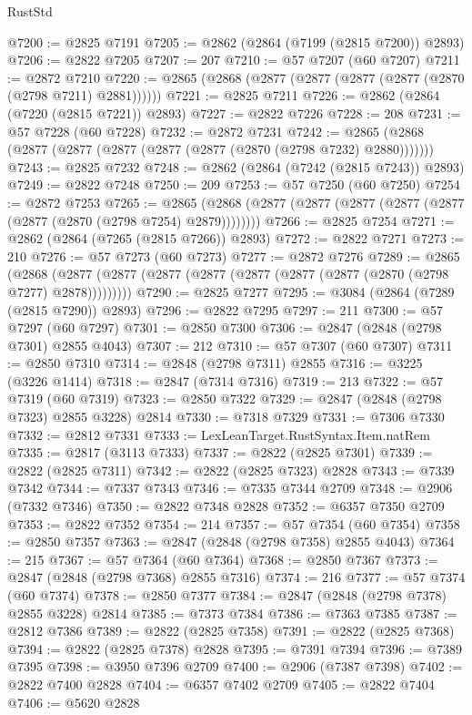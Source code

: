 \begin{lexlean}{RustStd}
\begin{coremodule}
@7200 := @2825 @7191
@7205 := @2862 (@2864 (@7199 (@2815 @7200)) @2893)
@7206 := @2822 @7205
@7207 := 207
@7210 := @57 @7207 (@60 @7207)
@7211 := @2872 @7210
@7220 := @2865 (@2868 (@2877 (@2877 (@2877 (@2877 (@2870 (@2798 @7211) @2881))))))
@7221 := @2825 @7211
@7226 := @2862 (@2864 (@7220 (@2815 @7221)) @2893)
@7227 := @2822 @7226
@7228 := 208
@7231 := @57 @7228 (@60 @7228)
@7232 := @2872 @7231
@7242 := @2865 (@2868 (@2877 (@2877 (@2877 (@2877 (@2877 (@2870 (@2798 @7232) @2880)))))))
@7243 := @2825 @7232
@7248 := @2862 (@2864 (@7242 (@2815 @7243)) @2893)
@7249 := @2822 @7248
@7250 := 209
@7253 := @57 @7250 (@60 @7250)
@7254 := @2872 @7253
@7265 := @2865 (@2868 (@2877 (@2877 (@2877 (@2877 (@2877 (@2877 (@2870 (@2798 @7254) @2879))))))))
@7266 := @2825 @7254
@7271 := @2862 (@2864 (@7265 (@2815 @7266)) @2893)
@7272 := @2822 @7271
@7273 := 210
@7276 := @57 @7273 (@60 @7273)
@7277 := @2872 @7276
@7289 := @2865
    (@2868 (@2877 (@2877 (@2877 (@2877 (@2877 (@2877 (@2877 (@2870 (@2798 @7277) @2878)))))))))
@7290 := @2825 @7277
@7295 := @3084 (@2864 (@7289 (@2815 @7290)) @2893)
@7296 := @2822 @7295
@7297 := 211
@7300 := @57 @7297 (@60 @7297)
@7301 := @2850 @7300
@7306 := @2847 (@2848 (@2798 @7301) @2855 @4043)
@7307 := 212
@7310 := @57 @7307 (@60 @7307)
@7311 := @2850 @7310
@7314 := @2848 (@2798 @7311) @2855
@7316 := @3225 (@3226 @1414)
@7318 := @2847 (@7314 @7316)
@7319 := 213
@7322 := @57 @7319 (@60 @7319)
@7323 := @2850 @7322
@7329 := @2847 (@2848 (@2798 @7323) @2855 @3228) @2814
@7330 := @7318 @7329
@7331 := @7306 @7330
@7332 := @2812 @7331
@7333 := LexLeanTarget.RustSyntax.Item.natRem
@7335 := @2817 (@3113 @7333)
@7337 := @2822 (@2825 @7301)
@7339 := @2822 (@2825 @7311)
@7342 := @2822 (@2825 @7323) @2828
@7343 := @7339 @7342
@7344 := @7337 @7343
@7346 := @7335 @7344 @2709
@7348 := @2906 (@7332 @7346)
@7350 := @2822 @7348 @2828
@7352 := @6357 @7350 @2709
@7353 := @2822 @7352
@7354 := 214
@7357 := @57 @7354 (@60 @7354)
@7358 := @2850 @7357
@7363 := @2847 (@2848 (@2798 @7358) @2855 @4043)
@7364 := 215
@7367 := @57 @7364 (@60 @7364)
@7368 := @2850 @7367
@7373 := @2847 (@2848 (@2798 @7368) @2855 @7316)
@7374 := 216
@7377 := @57 @7374 (@60 @7374)
@7378 := @2850 @7377
@7384 := @2847 (@2848 (@2798 @7378) @2855 @3228) @2814
@7385 := @7373 @7384
@7386 := @7363 @7385
@7387 := @2812 @7386
@7389 := @2822 (@2825 @7358)
@7391 := @2822 (@2825 @7368)
@7394 := @2822 (@2825 @7378) @2828
@7395 := @7391 @7394
@7396 := @7389 @7395
@7398 := @3950 @7396 @2709
@7400 := @2906 (@7387 @7398)
@7402 := @2822 @7400 @2828
@7404 := @6357 @7402 @2709
@7405 := @2822 @7404
@7406 := @5620 @2828

\end{coremodule}
\end{lexlean}

